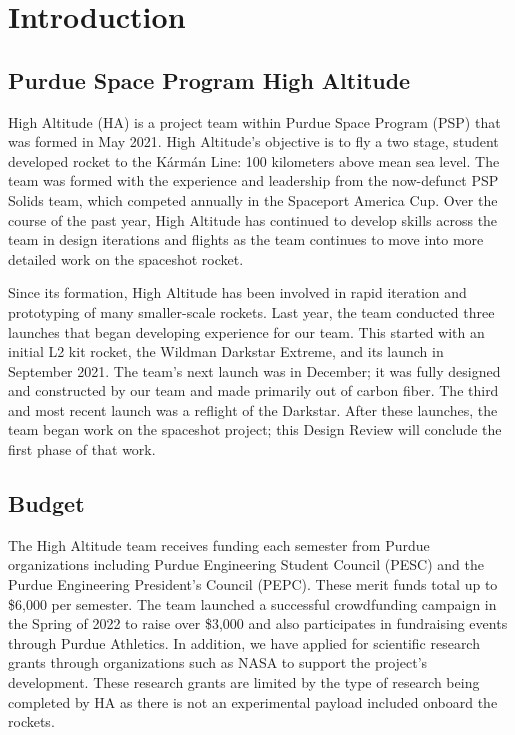 \section{Introduction}
\subsection{Purdue Space Program High Altitude}
High Altitude (HA) is a project team within Purdue Space Program (PSP) that was formed in May 2021. High Altitude’s objective is to fly a two stage, student developed rocket to the K\'{a}rm\'{a}n Line: 100 kilometers above mean sea level. The team was formed with the experience and leadership from the now-defunct PSP Solids team, which competed annually in the Spaceport America Cup. Over the course of the past year, High Altitude has continued to develop skills across the team in design iterations and flights as the team continues to move into more detailed work on the spaceshot rocket. 

Since its formation, High Altitude has been involved in rapid iteration and prototyping of many smaller-scale rockets. Last year, the team conducted three launches that began developing experience for our team. This started with an initial L2 kit rocket, the Wildman Darkstar Extreme, and its launch in September 2021. The team’s next launch was in December; it was fully designed and constructed by our team and made primarily out of carbon fiber. The third and most recent launch was a reflight of the Darkstar. After these launches, the team began work on the spaceshot project; this Design Review will conclude the first phase of that work.

\subsection{Budget}
The High Altitude team receives funding each semester from Purdue organizations including Purdue Engineering Student Council (PESC) and the Purdue Engineering President’s Council (PEPC).  These merit funds total up to \$6,000 per semester.  The team launched a successful crowdfunding campaign in the Spring of 2022 to raise over \$3,000 and also participates in fundraising events through Purdue Athletics.  In addition, we have applied for scientific research grants through organizations such as NASA to support the project’s development.  These research grants are limited by the type of research being completed by HA as there is not an experimental payload included onboard the rockets.

